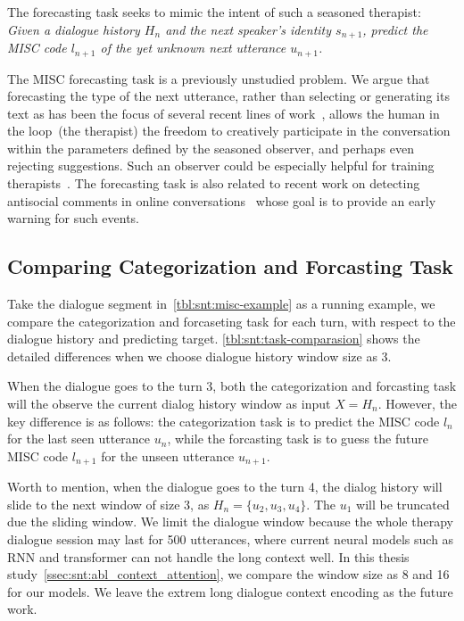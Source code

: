 The forecasting task seeks to mimic the intent of such a seasoned therapist:
\emph{Given a dialogue history $H_n$ and the next speaker's identity
  $s_{n+1}$, predict the MISC code $l_{n+1}$ of the yet unknown next
  utterance $u_{n+1}$.}

The MISC forecasting task is a previously unstudied problem. %
We argue that forecasting the type of the next utterance, rather than
selecting or generating its text as has been the focus of several
recent lines of work~\citep[\eg,][]{schatzmann2005quantitative,ubuntu,DSTC7},
allows the human in the loop~(the therapist) the freedom to
creatively participate in the conversation within the parameters
defined by the seasoned observer, and perhaps even rejecting
suggestions. Such an observer could be especially helpful for
training therapists~\citep{imel2017technology}.
%
The forecasting task is also related to recent work on detecting
antisocial comments in online
conversations~\citep{zhang2018conversations} whose goal is to
provide an early warning for such events.


\subsection{Comparing Categorization and Forcasting Task}
\label{ssec:snt:compararive-tasks}

Take the dialogue segment in~\autoref{tbl:snt:misc-example} as a
running example, we compare the categorization and forcaseting task
for each turn, with respect to the dialogue history and predicting
target. \autoref{tbl:snt:task-comparasion} shows the detailed
differences when we choose dialogue history window size as 3.

When the dialogue goes to the turn 3, both the categorization and
forcasting task will the observe the current dialog history window as
input $X=H_{n}$. However, the key difference is as follows: the
categorization task is to predict the MISC code $l_{n}$ for the last
seen utterance $u_{n}$, while the forcasting task is to guess the
future MISC code $l_{n+1}$ for the unseen utterance $u_{n+1}$.

Worth to mention, when the dialogue goes to the turn 4, the dialog
history will slide to the next window of size 3, as
$H_{n}=\{u_2,u_3,u_4\}$. The $u_{1}$ will be truncated due the sliding
window. We limit the dialogue window because the whole therapy
dialogue session may last for 500 utterances, where current neural
models such as RNN and transformer can not handle the long context
well.  In this thesis study~\autoref{ssec:snt:abl_context_attention},
we compare the window size as 8 and 16 for our models. We leave the
extrem long dialogue context encoding as the future work.

